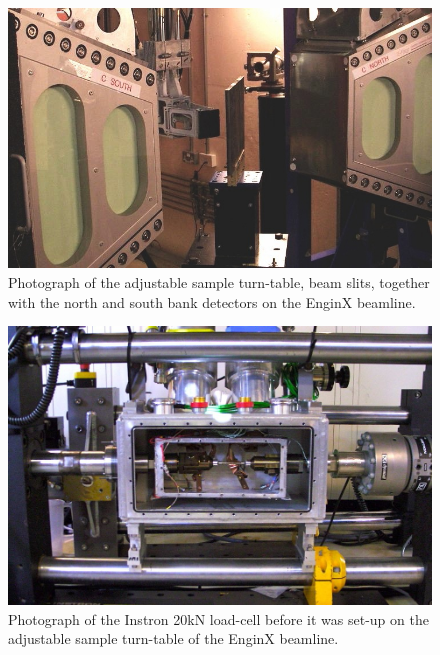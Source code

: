 %
\begin{figure}[H]
\begin{center}
\includegraphics[width=14cm]{enginxbanks}
\caption{Photograph of the adjustable sample turn-table, beam slits, together with the north and south bank detectors on the EnginX beamline.}\label{fig:enginxbanks}
\end{center}
\end{figure}
%
\begin{figure}[H]
\begin{center}
\includegraphics[width=14cm]{enginxloadcell}
\caption{Photograph of the Instron 20kN load-cell before it was set-up on the adjustable sample turn-table of the EnginX beamline.}\label{fig:enginxloadcell}
\end{center}
\end{figure}
%
